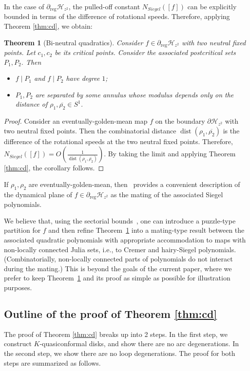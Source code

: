 \documentclass[11pt, reqno]{amsart}
\numberwithin{equation}{section}
\theoremstyle{plain}
\theoremstyle{theorem}
\theoremstyle{plain}
\newtheorem{maintheorem}{Theorem}
\theoremstyle{definition}
\DeclareMathOperator{\dist}{dist}
\numberwithin{figure}{section}
\begin{document}
In the case of $\partial_\text{reg}\mathcal{H}_{z^2}$, the pulled-off constant $N_{Siegel}([f])$ can be explicitly bounded in terms of the difference of rotational speeds. Therefore, applying Theorem \ref{thm:cd}, we obtain:
\begin{maintheorem}[Bi-neutral quadratics]\label{thm:hypz2}
Consider $f\in \partial_\text{reg} \mathcal H_{z^2}$ with two neutral fixed points. Let $c_1,c_2$ be its critical points. Consider the associated postcritical sets $P_1, P_2$. Then 
\begin{itemize}
    \item $f\mid P_1$ and $f\mid P_2$ have degree $1$;
    \item $P_1, P_2$ are separated by some annulus whose modulus depends only on the distance of $\rho_1, \overline{\rho_2} \in S^1$.
\end{itemize}
\end{maintheorem}
\begin{proof}
Consider an eventually-golden-mean map $f$ on the boundary $\partial\mathcal{H}_{z^2}$ with two neutral fixed points. Then the combinatorial distance $\dist(\rho_1,\overline{\rho_2})$ is the difference of the rotational speeds at the two neutral fixed points. Therefore, $N_{Siegel}([f])=O\left(\frac{1}{\dist(\rho_1,\overline{\rho_2})}\right)$.  By taking the limit and applying Theorem \ref{thm:cd}, the corollary follows.
\end{proof}


If $\rho_1, \rho_2$ are eventually-golden-mean, then~\cite{YZ01} provides a convenient description of the dynamical plane of $f\in \partial_\text{reg} \mathcal H_{z^2}$ as the mating of the associated Siegel polynomials. 



We believe that, using the sectorial bounds~\cite{DL:sector bounds}, one can introduce a puzzle-type partition for $f$ and then refine Theorem~\ref{thm:hypz2} into a mating-type result between the associated quadratic polynomials with appropriate accommodation to maps with non-locally connected Julia sets, i.e., to Cremer and hairy-Siegel polynomials. (Combinatorially, non-locally connected parts of polynomials do not interact during the mating.) This is beyond the goals of the current paper, where we prefer to keep Theorem~\ref{thm:hypz2} and its proof as simple as possible for illustration purposes.




\subsection{Outline of the proof of Theorem \ref{thm:cd}} \label{ss:prf:Thm:cd}
The proof of Theorem \ref{thm:cd} breaks up into 2 steps.
In the first step, we construct $K$-quasiconformal disks, and show there are no arc degenerations.
In the second step, we show there are no loop degenerations.
The proof for both steps are summarized as follows.
\end{document}
